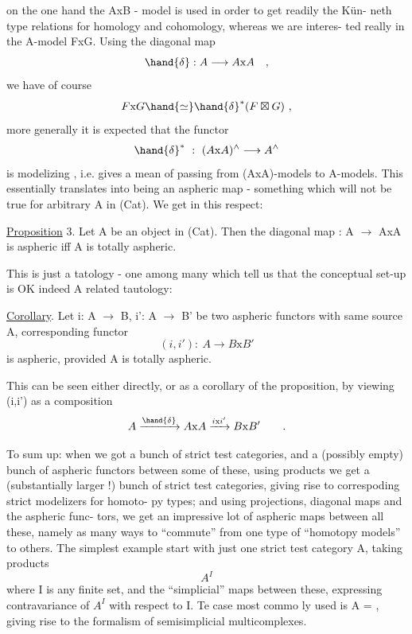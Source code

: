 
on the one hand the AxB - model is used in order to get readily the Kün-%
neth type relations for homology and cohomology, whereas we are interes-%
ted really in the A-model FxG. Using the diagonal map
\[ \hand{\delta} : A \longrightarrow A\mathrm{x}A \quad , \]
we have of course
\[ F\mathrm{x}G \hand{\simeq} \hand{\delta}^{*}(F\boxtimes G) \ , \]
more generally it is expected that the functor
\[ \hand{\delta}^{*} \ : \ (A\mathrm{x}A)^{\wedge} \longrightarrow A^{\wedge} \]
is modelizing , i.e. gives a mean of passing from (AxA)-models to
A-models. This essentially translates into \hand{$\delta$} being an aspheric map -
something which will not be true for arbitrary A in (Cat). We get in
this respect:

\uline{Proposition} 3. Let A be an object in (Cat). Then the diagonal map
 \hand{$\delta$} : A $\to$ AxA is aspheric iff A is totally aspheric.

This is just a tatology - one among many which tell us that the
conceptual set-up is OK indeed A related tautology:

\uline{Corollary}. Let i: A $\to$ B, i': A $\to$ B' be two aspheric functors with
same source A,  corresponding functor
\[ (i,i') : \ A \longrightarrow B\mathrm{x}B' \]
is aspheric, provided A is totally aspheric.

This can be seen either directly, or as a corollary of the
proposition, by viewing (i,i') as a composition
\[ A \xrightarrow{\hand{\delta}} A\mathrm{x}A \xrightarrow{i\mathrm{x}i'} B\mathrm{x}B' \qquad . \]

To sum up: when we got a bunch of strict test categories, and
a (possibly empty) bunch of aspheric functors between some of these,
using  products we get a (substantially larger !) bunch of strict test
categories, giving rise to correspoding strict modelizers for homoto-%
py types; and using projections, diagonal maps\hand{,} and the  aspheric func-%
tors, we get an impressive lot of aspheric maps between all these,
namely as many ways to ``commute'' from one type of ``homotopy models'' to
others. The simplest example\hand{:}  start with just one strict test
category A, taking products
\[ A^{I} \]
where I is any finite set, and the ``simplicial'' maps between these,
expressing contravariance of $A^{I}$ with respect to I. Te case most commo%
ly used is A = \hand{$\Delta$}, giving rise to the formalism of semisimplicial
multicomplexes.


